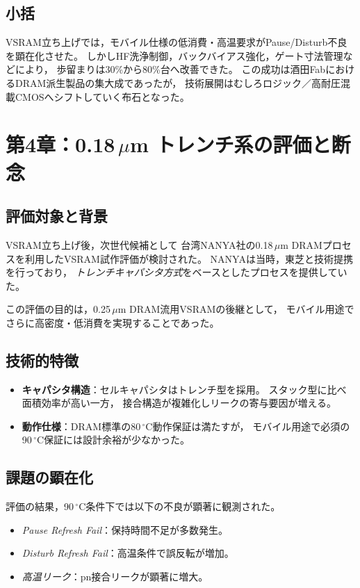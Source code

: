 \documentclass[conference]{IEEEtran}
\begin{document}
\subsection{小括}
VSRAM立ち上げでは，モバイル仕様の低消費・高温要求がPause/Disturb不良を顕在化させた。
しかしHF洗浄制御，バックバイアス強化，ゲート寸法管理などにより，
歩留まりは30\%から80\%台へ改善できた。
この成功は酒田FabにおけるDRAM派生製品の集大成であったが，
技術展開はむしろロジック／高耐圧混載CMOSへシフトしていく布石となった。

\section{第4章：0.18\,\texorpdfstring{$\mu$m}{μm} トレンチ系の評価と断念}

\subsection{評価対象と背景}
VSRAM立ち上げ後，次世代候補として
台湾NANYA社の0.18\,$\mu$m DRAMプロセスを利用したVSRAM試作評価が検討された。
NANYAは当時，東芝と技術提携を行っており，
\emph{トレンチキャパシタ方式}をベースとしたプロセスを提供していた。

この評価の目的は，0.25\,$\mu$m DRAM流用VSRAMの後継として，
モバイル用途でさらに高密度・低消費を実現することであった。

\subsection{技術的特徴}
\begin{itemize}
  \item \textbf{キャパシタ構造}：セルキャパシタはトレンチ型を採用。
        スタック型に比べ面積効率が高い一方，
        接合構造が複雑化しリークの寄与要因が増える。
  \item \textbf{動作仕様}：DRAM標準の80\,$^\circ$C動作保証は満たすが，
        モバイル用途で必須の90\,$^\circ$C保証には設計余裕が少なかった。
\end{itemize}

\subsection{課題の顕在化}
評価の結果，90\,$^\circ$C条件下では以下の不良が顕著に観測された。
\begin{itemize}
  \item \emph{Pause Refresh Fail}：保持時間不足が多数発生。
  \item \emph{Disturb Refresh Fail}：高温条件で誤反転が増加。
  \item \emph{高温リーク}：pn接合リークが顕著に増大。
\end{itemize}
\end{document}
